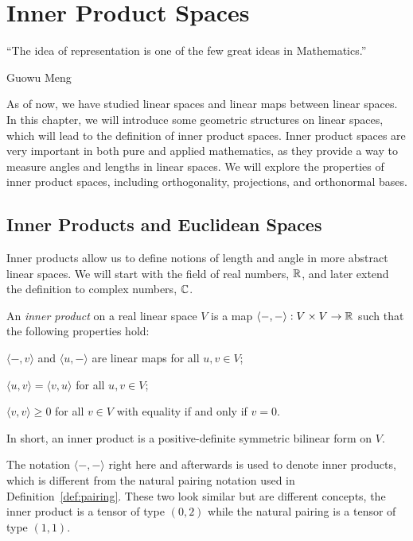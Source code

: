 \chapter{Inner Product Spaces}

\epigraph{``The idea of representation is one of the few great ideas in Mathematics.''}{Guowu Meng}

As of now, we have studied linear spaces and linear maps between linear spaces. In this chapter, we will introduce some geometric structures on linear spaces, which will lead to the definition of inner product spaces. Inner product spaces are very important in both pure and applied mathematics, as they provide a way to measure angles and lengths in linear spaces. We will explore the properties of inner product spaces, including orthogonality, projections, and orthonormal bases.

\section{Inner Products and Euclidean Spaces}
Inner products allow us to define notions of length and angle in more abstract linear spaces. We will start with the field of real numbers, $\operatorname{\mathbb{R}}$, and later extend the definition to complex numbers, $\operatorname{\mathbb{C}}$.

\begin{definition}\label{def:inner_product}
	An \emph{inner product} on a real linear space $V$ is a map $\langle -, - \rangle : V \times V \to \operatorname{\mathbb{R}}$ such that the following properties hold:
	\begin{description}[labelwidth=\widthof{\bfseries Positive-definiteness:~}]
		\item[Bilinearity] $\langle -, v \rangle$ and $\langle u, - \rangle$ are linear maps for all $u, v \in V$;
		\item[Symmetry] $\langle u, v \rangle = \langle v, u \rangle$ for all $u, v \in V$;
		\item[Positive-definiteness] $\langle v, v \rangle \geq 0$ for all $v \in V$ with equality if and only if $v = 0$.
	\end{description}
	In short, an inner product is a positive-definite symmetric bilinear form on $V$.
\end{definition}
\begin{remark}
	The notation $\langle -, - \rangle$ right here and afterwards is used to denote inner products, which is different from the natural pairing notation used in Definition~\ref{def:pairing}. These two look similar but are different concepts, the inner product is a tensor of type $(0, 2)$ while the natural pairing is a tensor of type $(1, 1)$.
\end{remark}

